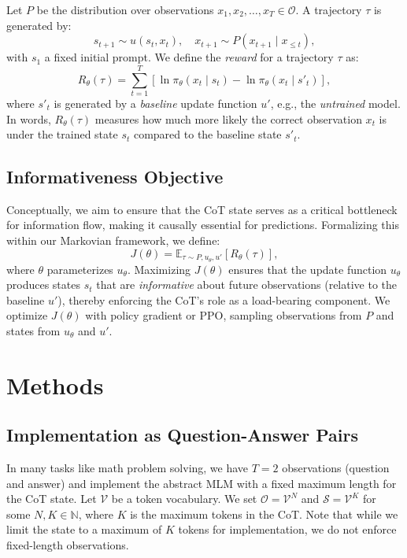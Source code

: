 \documentclass{article} %
\begin{document}
Let $P$ be the distribution over observations $x_1, x_2, \dots, x_T \in \mathcal{O}$. A trajectory $\tau$ is generated by:
\[
s_{t+1}\sim u(s_t, x_t), \quad x_{t+1}\sim P(x_{t+1}\mid x_{\le t}),
\]
with $s_1$ a fixed initial prompt. We define the \emph{reward} for a trajectory $\tau$ as:
\[
R_\theta(\tau)=\sum_{t=1}^T \left[\ln \pi_\theta(x_t\mid s_t)-\ln \pi_\theta(x_t\mid s'_t)\right],
\]
where $s'_t$ is generated by a \emph{baseline} update function $u'$, e.g., the \emph{untrained} model. In words, $R_\theta(\tau)$ measures how much more likely the correct observation $x_t$ is under the trained state $s_t$ compared to the baseline state $s'_t$.

\subsection{Informativeness Objective}

Conceptually, we aim to ensure that the CoT state serves as a critical bottleneck for information flow, making it causally essential for predictions. Formalizing this within our Markovian framework, we define:
\[
  J(\theta)=\mathbb{E}_{\tau \sim P,u_\theta,u'}\left[R_\theta(\tau)\right],
\]
where $\theta$ parameterizes $u_\theta$. Maximizing $J(\theta)$ ensures that the update function $u_\theta$ produces states $s_t$ that are \emph{informative} about future observations (relative to the baseline $u'$), thereby enforcing the CoT's role as a load-bearing component. We optimize $J(\theta)$ with policy gradient or PPO, sampling observations from $P$ and states from $u_\theta$ and $u'$.

\section{Methods}
\label{sec:method}

\subsection{Implementation as Question-Answer Pairs}
In many tasks like math problem solving, we have $T=2$ observations (question and answer) and implement the abstract MLM with a fixed maximum length for the CoT state. Let $\mathcal{V}$ be a token vocabulary. We set $\mathcal{O} = \mathcal{V}^N$ and $\mathcal{S} = \mathcal{V}^K$ for some $N, K \in \mathbb{N}$, where $K$ is the maximum tokens in the CoT. Note that while we limit the state to a maximum of $K$ tokens for implementation, we do not enforce fixed-length observations. 
\end{document}
